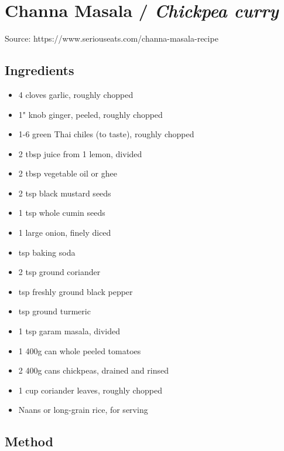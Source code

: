 \section{Channa Masala / \emph{Chickpea curry}}


Source: https://www.seriouseats.com/channa-masala-recipe

\subsection{Ingredients}

\begin{itemize}
    \item 4 cloves garlic, roughly chopped
    \item 1" knob ginger, peeled, roughly chopped
    \item 1-6 green Thai chiles (to taste), roughly chopped
    \item 2 tbsp juice from 1 lemon, divided
    \item 2 tbsp vegetable oil or ghee
    \item 2 tsp black mustard seeds
    \item 1 tsp whole cumin seeds
    \item 1 large onion, finely diced
    \item {} tsp baking soda
    \item 2 tsp ground coriander
    \item {} tsp freshly ground black pepper
    \item {} tsp ground turmeric
    \item 1 tsp garam masala, divided
    \item 1 400g can whole peeled tomatoes
    \item 2 400g cans chickpeas, drained and rinsed
    \item 1 cup coriander leaves, roughly chopped
    \item Naans or long-grain rice, for serving
\end{itemize}

\subsection{Method}

